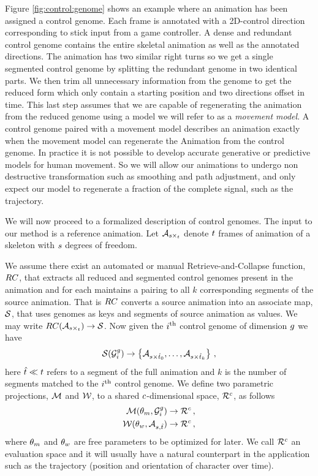 Figure \ref{fig:control:genome} shows an example where an animation has been assigned a control genome. Each frame is annotated with a 2D-control direction corresponding to stick input from a game controller. A dense and redundant control genome contains the entire skeletal animation as well as the annotated directions. The animation has two similar right turns so we get a single segmented control genome by splitting the redundant genome in two identical parts. We then trim all unnecessary information from the genome to get the reduced form which only contain a starting position and two directions offset in time. This last step assumes that we are capable of regenerating the animation from the reduced genome using a model we will refer to as a \textit{movement model}. A control genome paired with a movement model describes an animation exactly when the movement model can regenerate the Animation from the control genome.  In practice it is not possible to develop accurate generative or predictive models for human movement. So we will allow our animations to undergo non destructive transformation such as smoothing and path adjustment, and only expect our model to regenerate a fraction of the complete signal, such as the trajectory. 

We will now proceed to a formalized description of control genomes. The input to our method is a reference animation. Let $\mathcal{A}_{s\times_t}$ denote $t$ frames of animation of a skeleton with $s$ degrees of freedom. 

We assume there exist an automated or manual Retrieve-and-Collapse function, ${RC}$,  that extracts all reduced and segmented control genomes present in the animation and for each maintains a pairing to all $k$ corresponding segments of the source animation. That is ${RC}$ converts a source animation into an associate map, $\mathcal{S}$, that uses genomes as keys and segments of source animation as values. We may write ${RC}(\mathcal{A}_{s\times_t}) \rightarrow \mathcal{S}$. Now given the $i ^{\text{th}}$ control genome of dimension $g$ we have
\begin{equation}
 \mathcal{S}(\mathcal{G}^g_i) \rightarrow \left\{\mathcal{A}_{s\times{\hat{t}}_0},\ldots,\mathcal{A}_{s\times{\hat{t}}_k}\right\}   \,,
\end{equation}
here ${\hat{t}}\ll t$ refers to a segment of the full animation and $k$ is the number of segments matched to the $i ^{\text{th}}$ control genome. 
%
We define two parametric projections, $\mathcal{M}$ and $\mathcal{W}$, to a shared $c$-dimensional space, $\mathcal{R}^{c}$, as follows
\begin{align}
\mathcal{M}(\theta_{m},\mathcal{G}_i^{g}) 
&\rightarrow 
\mathcal{R}^{c}    \,,
\\
\mathcal{W}(\theta_{w},\mathcal{A}_{s,{\hat{t}}})
&\rightarrow
\mathcal{R}^{c} \,,
\end{align}
where $\theta_{m}$ and $\theta_{w}$ are free parameters to be optimized for later. We call $\mathcal{R}^{c}$ an evaluation space and it will usually have a natural counterpart in the application such as the trajectory (position and orientation of character over time).

